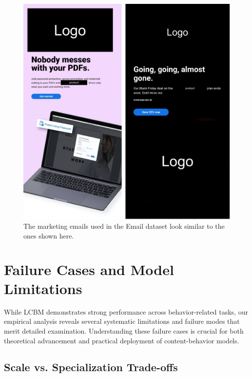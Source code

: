 \begin{figure}[!htbp]
    \centering
    \includegraphics[width=\textwidth]{images/email-ex-logo-redacted.pdf}
    \caption{The \companyName marketing emails used in the Email dataset look similar to the ones shown here.}
    \label{fig:figure-email-example-expanded}
\end{figure}




\section{Failure Cases and Model Limitations}
\label{sec:failure-cases}

While LCBM demonstrates strong performance across behavior-related tasks, our empirical analysis reveals several systematic limitations and failure modes that merit detailed examination. Understanding these failure cases is crucial for both theoretical advancement and practical deployment of content-behavior models.

\subsection{Scale vs. Specialization Trade-offs}

